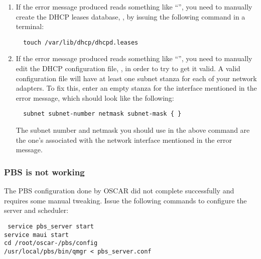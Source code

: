 \begin{enumerate}
\item If the error message produced reads something like
  ``'', you need to manually create
  the DHCP leases database, , by
  issuing the following command in a terminal:

\begin{verbatim}
  touch /var/lib/dhcp/dhcpd.leases
\end{verbatim}
  
\item If the error message produced reads something like ``'', you need to manually edit the DHCP
  configuration file, , in order to try to get
  it valid. A valid configuration file will have at least one subnet
  stanza for each of your network adapters. To fix this, enter an
  empty stanza for the interface mentioned in the error message, which
  should look like the following:

\begin{verbatim}
  subnet subnet-number netmask subnet-mask { }
\end{verbatim}
  
  The subnet number and netmask you should use in the above command
  are the one's associated with the network interface mentioned in the
  error message.
\end{enumerate}

\subsubsection{PBS is not working}


The PBS configuration done by OSCAR did not complete successfully and
requires some manual tweaking. Issue the following commands to
configure the server and scheduler:

\vspace{11pt}
{\tt
  service pbs\_server start \\
\indent  service maui start \\
\indent  cd /root/oscar-\oscarversion/pbs/config \\
\indent  /usr/local/pbs/bin/qmgr < pbs\_server.conf
}
\vspace{11pt}

